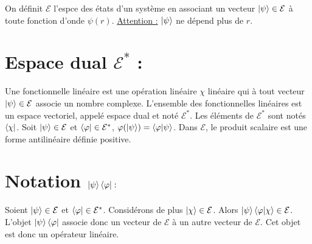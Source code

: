 \documentclass{article}
\begin{document}
On définit $\mathcal{E}$ l'espce des états d'un système en associant un vecteur $\ket{\psi} \in \mathcal{E}$ à toute fonction d'onde $\psi(r)$.
\underline{Attention :} $\ket{\psi}$ ne dépend plus de $r$.

\section{Espace dual $\mathcal{E^*}$ :}

Une fonctionnelle linéaire est une opération linéaire $\chi$ linéaire qui à tout vecteur $\ket{\psi} \in \mathcal{E}$ associe un nombre complexe. L'ensemble des fonctionnelles linéaires est un espace vectoriel, appelé espace dual et noté $\mathcal{E^*}$. Les éléments de $\mathcal{E^*}$ sont notés $\bra{\chi}$. Soit $\ket{\psi} \in \mathcal{E}$ et $\bra{\varphi} \in \mathcal{E^*}$, $\varphi(\ket{\psi}) = \braket{\varphi|\psi}$. Dans $\mathcal{E}$, le produit scalaire est une forme antilinéaire définie positive.

\section{Notation $\ket{\psi}\bra{\varphi} :$}

Soient $\ket{\psi} \in \mathcal{E}$ et $\bra{\varphi} \in \mathcal{E^*}$. Considérons de plus $\ket{\chi} \in \mathcal{E}$. Alors $\ket{\psi}\braket{\varphi|\chi} \in \mathcal{E}$. L'objet $\ket{\psi}\bra{\varphi}$ associe donc un vecteur de $\mathcal{E}$ à un autre vecteur de $\mathcal{E}$. Cet objet est donc un opérateur linéaire.
\end{document}
